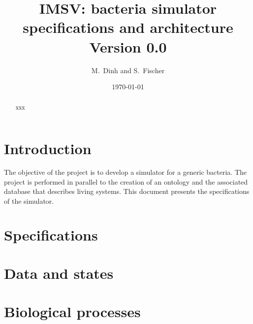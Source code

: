 \documentclass[12pt]{article}
\theoremstyle{definition}
\theoremstyle{remark}
\numberwithin{equation}{section}
\begin{document}
\normalem

\title{{IMSV}: bacteria simulator specifications and architecture \\ Version 0.0}%
\author{M.~Dinh and S.~Fischer}%
\date{\today}%
\maketitle
\begin{abstract}
  xxx %
\end{abstract}
\section{Introduction}

The objective of the project is to develop a simulator for a generic bacteria. The project is performed in parallel to the creation of an ontology and the associated database that describes living systems. This document presents the specifications of the simulator.



\section{Specifications}


\clearpage

\section{Data and states}


\clearpage

\section{Biological processes}




%

\printindex
\end{document}
